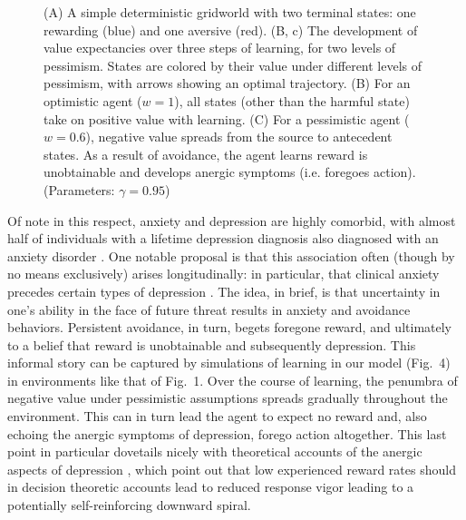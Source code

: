 \documentclass[manuscript]{stjour}
\begin{document}
\begin{figure}[!b]
\caption{(A) A simple deterministic gridworld with two terminal states: one rewarding (blue) and one aversive (red). (B, c) The development of value expectancies over three steps of learning, for two levels of pessimism. States are colored by their value under different levels of pessimism, with arrows showing an optimal trajectory. (B) For an optimistic agent ($w=1$), all states (other than the harmful state) take on positive value with learning. (C) For a pessimistic agent ($w=0.6$), negative value spreads from the source to antecedent states. As a result of avoidance, the agent learns reward is unobtainable and develops anergic symptoms (i.e. foregoes action). (Parameters: $\gamma = 0.95$)}
\label{fig:lh}
\end{figure}

Of note in this respect, anxiety and depression are highly comorbid, with almost half of individuals with a lifetime depression diagnosis also diagnosed with an anxiety disorder \citep{kessler2015}. One notable proposal is that this association often (though by no means exclusively) arises longitudinally: in particular, that clinical anxiety precedes certain types of depression \citep{alloy1990, jacobson2014}. The idea, in brief, is that uncertainty in one's ability in the face of future threat results in anxiety and avoidance behaviors. Persistent avoidance, in turn, begets foregone reward, and ultimately to a belief that reward is unobtainable and subsequently depression. This informal story can be captured by simulations of learning in our model (Fig.~4) in environments like that of Fig.~1. Over the course of learning, the penumbra of negative value under pessimistic assumptions spreads gradually throughout the environment. This can in turn lead the agent to expect no reward and, also echoing the anergic symptoms of depression, forego action altogether. This last point in particular dovetails nicely with theoretical accounts of the anergic aspects of depression \citep{huys2015}, which point out that low experienced reward rates should in decision theoretic accounts lead to reduced response vigor \citep{niv2007} leading to a potentially self-reinforcing downward spiral.
\end{document}
